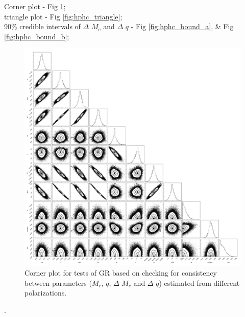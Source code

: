 \documentclass[prd,preprintnumbers,twocolumn,eqsecnum,floatfix,a4paper,nofootinbib,superscriptaddress]{revtex4}
\begin{document}
\newpage 
\noindent Corner plot  - Fig \ref{fig:hphc_corner};\\
triangle plot - Fig \ref{fig:hphc_triangle};\\
90\% credible intervals of $\Delta$ $M_{c}$ and $\Delta$ $q$  - Fig \ref{fig:hphc_bound_a}, \& Fig \ref{fig:hphc_bound_b};

\newpage

\begin{figure}[htb]
    \begin{center}
    \includegraphics[scale=0.3]{figs/hp_hc_consistency_polarization_corner_plot_M_80_q_9_snr_25.png} 
    \end{center} 
    \caption{Corner plot for tests of GR based on checking for consistency between parameters ($M_{c}$, $q$, 
    $\Delta$ $M_{c}$ and $\Delta$ $q$) estimated from different polarizations. }
    \label{fig:hphc_corner}
\end{figure}

\newpage
.
\newpage
\end{document}
